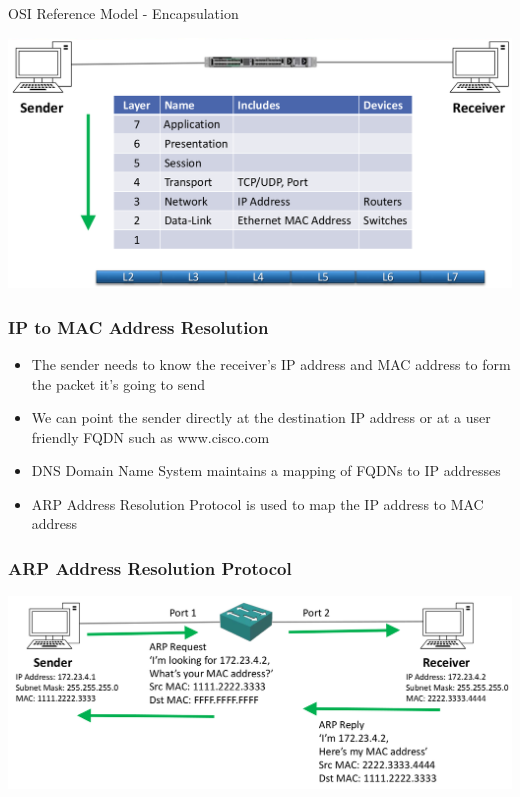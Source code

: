 \documentclass[pdflatex,compress,mathserif]{beamer}
\begin{document}
\begin{frame}{OSI Reference Model - Encapsulation}
	\begin{center}
		\includegraphics[width=\linewidth]{img/img07}
	\end{center}
\end{frame}

\begin{frame}
	\frametitle{IP to MAC Address Resolution}
	\begin{itemize}
		\item The sender needs to know the receiver’s IP address and MAC address to form the packet it’s going to send
		\item We can point the sender directly at the destination IP address or at a user friendly FQDN such as www.cisco.com
		\item DNS Domain Name System maintains a mapping of FQDNs to IP addresses
		\item ARP Address Resolution Protocol is used to map the IP address to MAC address
	\end{itemize}
\end{frame}

\begin{frame}
	\frametitle{ARP Address Resolution Protocol}
	\begin{center}
		\includegraphics[width=\linewidth]{img/img08}
	\end{center}
\end{frame}
\end{document}
